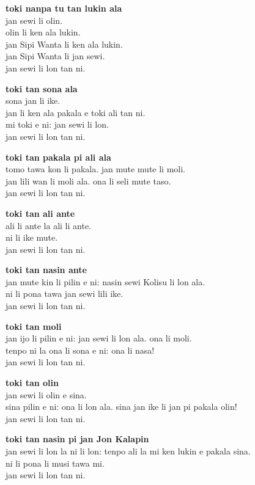 \textbf{toki nanpa tu tan lukin ala}   \\
jan sewi li olin.   \\
olin li ken ala lukin.   \\
jan Sipi Wanta li ken ala lukin.  \\
jan Sipi Wanta li jan sewi.   \\
jan sewi li lon tan ni.

\textbf{toki tan sona ala}   \\
sona jan li ike.   \\
jan li ken ala pakala e toki ali tan ni.   \\
mi toki e ni: jan sewi li lon.   \\
jan sewi li lon tan ni.

\textbf{toki tan pakala pi ali ala}   \\
tomo tawa kon li pakala. jan mute mute li moli.   \\
jan lili wan li moli ala. ona li seli mute taso.   \\
jan sewi li lon tan ni.

\textbf{toki tan ali ante}   \\
ali li ante la ali li ante.   \\
ni li ike mute.   \\
jan sewi li lon tan ni.

\textbf{toki tan nasin ante}   \\
jan mute kin li pilin e ni: nasin sewi Kolisu li lon ala.       \\
ni li pona tawa jan sewi lili ike.   \\
jan sewi li lon tan ni.

\textbf{toki tan moli}   \\
jan ijo li pilin e ni: jan sewi li lon ala. ona li moli.   \\
tenpo ni la ona li sona e ni: ona li nasa!   \\
jan sewi li lon tan ni.

\textbf{toki tan olin}   \\
jan sewi li olin e sina.   \\
sina pilin e ni: ona li lon ala. sina jan ike li jan pi pakala olin!   \\
jan sewi li lon tan ni.

\textbf{toki tan nasin pi jan Jon Kalapin}    \\
jan sewi li lon la ni li lon: tenpo ali la mi ken lukin e pakala sina.   \\
ni li pona li musi tawa mi.   \\
jan sewi li lon tan ni.

